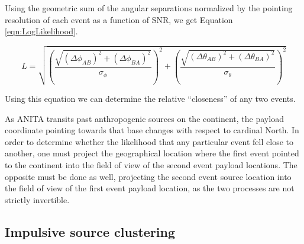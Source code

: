 		Using the geometric sum of the angular separations normalized by the pointing resolution of each event as a function of SNR, we get Equation \ref{eqn:LogLikelihood}.
		
	\begin{equation}
		L = \sqrt{(\frac{\sqrt{(\Delta\phi_{AB})^2+(\Delta\phi_{BA})^2}}{{\sigma_{\phi}}})^2+(\frac{\sqrt{(\Delta\theta_{AB})^2+(\Delta\theta_{BA})^2}}{{\sigma_{\theta}}})^2}
		\label{eqn:LogLikelihood}
	\end{equation}
		
		Using this equation we can determine the relative ``closeness'' of any two events.  
		

		
		As ANITA transits past anthropogenic sources on the continent, the payload coordinate pointing towards that base changes with respect to cardinal North. In order to determine whether the likelihood that any particular event fell close to another, one must project the geographical location where the first event pointed to the continent into the field of view of the second event payload locations.  The opposite must be done as well, projecting the second event source location into the field of view of the first event payload location, as the two processes are not strictly invertible.

	


	\subsection{Impulsive source clustering}
	
